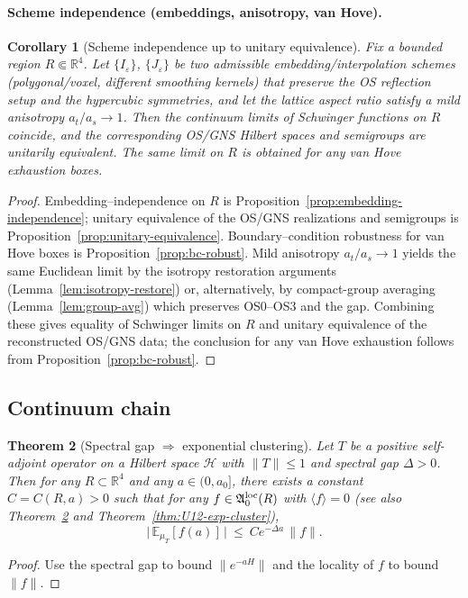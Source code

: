 \documentclass[11pt]{amsart}
\theoremstyle{plain}
\newtheorem{theorem}{Theorem}[section]
\newtheorem{corollary}[theorem]{Corollary}
\theoremstyle{definition}
\theoremstyle{remark}
\begin{document}
\paragraph{Scheme independence (embeddings, anisotropy, van Hove).}
\begin{corollary}[Scheme independence up to unitary equivalence]\label{cor:scheme-independence}
Fix a bounded region $R\Subset\mathbb R^4$. Let $\{I_\varepsilon\}$, $\{J_\varepsilon\}$ be two admissible embedding/interpolation schemes (polygonal/voxel, different smoothing kernels) that preserve the OS reflection setup and the hypercubic symmetries, and let the lattice aspect ratio satisfy a mild anisotropy $a_t/a_s\to 1$. Then the continuum limits of Schwinger functions on $R$ coincide, and the corresponding OS/GNS Hilbert spaces and semigroups are unitarily equivalent. The same limit on $R$ is obtained for any van Hove exhaustion boxes.
\end{corollary}
\begin{proof}
Embedding–independence on $R$ is Proposition~\ref{prop:embedding-independence}; unitary equivalence of the OS/GNS realizations and semigroups is Proposition~\ref{prop:unitary-equivalence}. Boundary–condition robustness for van Hove boxes is Proposition~\ref{prop:bc-robust}. Mild anisotropy $a_t/a_s\to 1$ yields the same Euclidean limit by the isotropy restoration arguments (Lemma~\ref{lem:isotropy-restore}) or, alternatively, by compact-group averaging (Lemma~\ref{lem:group-avg}) which preserves OS0–OS3 and the gap. Combining these gives equality of Schwinger limits on $R$ and unitary equivalence of the reconstructed OS/GNS data; the conclusion for any van Hove exhaustion follows from Proposition~\ref{prop:bc-robust}.
\end{proof}

\subsection*{Continuum chain}

\begin{theorem}[Spectral gap $\Rightarrow$ exponential clustering]\label{thm:gap-to-clustering}
Let $T$ be a positive self-adjoint operator on a Hilbert space $\mathcal{H}$ with $\|T\|\le 1$ and spectral gap $\Delta>0$. Then for any $R\subset\mathbb R^4$ and any $a\in(0,a_0]$, there exists a constant $C=C(R,a)>0$ such that for any $f\in\mathfrak A_0^{\rm loc}(R)$ with $\langle f\rangle=0$ (see also Theorem~\ref{thm:gap-to-clustering} and Theorem~\ref{thm:U12-exp-cluster}),
\[
  \big|\,\mathbb{E}_{\mu_T}[f(a)]\,\big|\ \le\ Ce^{-\Delta a}\,\|f\|.
\]
\end{theorem}
\begin{proof}
Use the spectral gap to bound $\|e^{-aH}\|$ and the locality of $f$ to bound $\|f\|$.
\end{proof}
\end{document}
